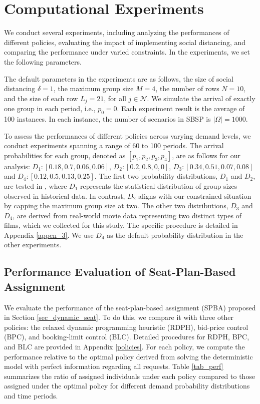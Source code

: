 \section{Computational Experiments}\label{sec_result}
We conduct several experiments, including analyzing the performances of different policies, evaluating the impact of implementing social distancing, and comparing the performance under varied constraints.
In the experiments, we set the following parameters. 

The default parameters in the experiments are as follows, the size of social distancing $\delta =1$, the maximum group size $M =4$, the number of rows $N = 10$, and the size of each row $L_j = 21$, for all $j \in \mathcal{N}$. We simulate the arrival of exactly one group in each period, i.e., $p_0 = 0$. Each experiment result is the average of 100 instances. In each instance, the number of scenarios in SBSP is $|\Omega| = 1000$.

To assess the performances of different policies across varying demand levels, we conduct experiments spanning a range of 60 to 100 periods. The arrival probabilities for each group, denoted as $[p_1,p_2,p_3,p_4]$, are as follows for our analysis: $D_1:[0.18,0.7,0.06,0.06]$, $D_2:[0.2,0.8,0,0]$, $D_3: [0.34, 0.51, 0.07, 0.08]$ and $D_4: [0.12, 0.5, 0.13, 0.25]$. The first two probability distributions, $D_1$ and $D_2$, are tested in \cite{blom2022filling}, where $D_1$ represents the statistical distribution of group sizes observed in historical data. In contrast, $D_2$ aligns with our constrained situation by capping the maximum group size at two. The other two distributions, $D_3$ and $D_4$, are derived from real-world movie data representing two distinct types of films, which we collected for this study. The specific procedure is detailed in Appendix \ref{appen_3}. We use $D_4$ as the default probability distribution in the other experiments.


\subsection{Performance Evaluation of Seat-Plan-Based Assignment}
We evaluate the performance of the seat-plan-based assignment (SPBA) proposed in Section \ref{sec_dynamic_seat}. To do this, we compare it with three other policies: the relaxed dynamic programming heuristic (RDPH), bid-price control (BPC), and booking-limit control (BLC). Detailed procedures for RDPH, BPC, and BLC are provided in Appendix \ref{policies}. For each policy, we compute the performance relative to the optimal policy derived from solving the deterministic model with perfect information regarding all requests. Table \ref{tab_perf} summarizes the ratio of assigned individuals under each policy compared to those assigned under the optimal policy for different demand probability distributions and time periods. 


